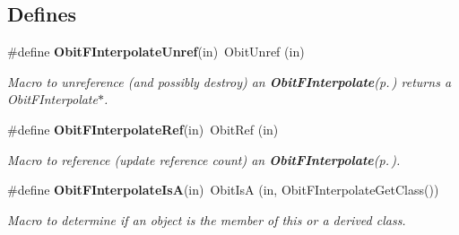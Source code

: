 \subsection*{Defines}
\begin{CompactItemize}
\item 
\#define {\bf Obit\-FInterpolate\-Unref}(in)\ Obit\-Unref (in)
\begin{CompactList}\small\item\em Macro to unreference (and possibly destroy) an {\bf Obit\-FInterpolate}{\rm (p.\,\pageref{structObitFInterpolate})} returns a Obit\-FInterpolate$\ast$. \item\end{CompactList}\item 
\#define {\bf Obit\-FInterpolate\-Ref}(in)\ Obit\-Ref (in)
\begin{CompactList}\small\item\em Macro to reference (update reference count) an {\bf Obit\-FInterpolate}{\rm (p.\,\pageref{structObitFInterpolate})}. \item\end{CompactList}\item 
\#define {\bf Obit\-FInterpolate\-Is\-A}(in)\ Obit\-Is\-A (in, Obit\-FInterpolate\-Get\-Class())
\begin{CompactList}\small\item\em Macro to determine if an object is the member of this or a derived class. \item\end{CompactList}\end{CompactItemize}
